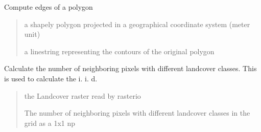 \documentclass[letterpaper,10pt,english]{article}
\begin{document}

\begin{fulllineitems}
\label{\detokenize{indexes_func:indexes_func.calc_edges}}
\pysigstartsignatures
{}
\pysigstopsignatures
\sphinxAtStartPar
Compute edges of a polygon
\begin{quote}\begin{description}
\sphinxAtStartPar
{} \textendash{} a shapely polygon projected in a geographical coordinate system (meter unit)

\sphinxAtStartPar
a linestring representing the contours of the original polygon

\end{description}\end{quote}

\end{fulllineitems}


\begin{fulllineitems}
\label{\detokenize{indexes_func:indexes_func.calc_iji}}
\pysigstartsignatures
{}
\pysigstopsignatures
\sphinxAtStartPar
Calculate the number of neighboring pixels with different landcover classes. This is used to calculate the i. i. d.
\begin{quote}\begin{description}
\sphinxAtStartPar
{} \textendash{} the Landcover raster read by rasterio

\sphinxAtStartPar
The number of neighboring pixels with different landcover classes in the grid as a 1x1 np

\end{description}\end{quote}

\end{fulllineitems}

\end{document}
